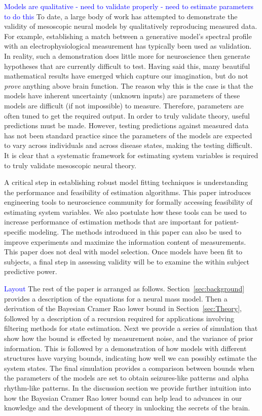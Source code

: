 \documentclass{article}
\newcommand{\brian}[1]{\textcolor{blue}{#1}}
\begin{document}
\brian{Models are qualitative - need to validate properly - need to estimate parameters to do this}
To date, a large body of work has attempted to demonstrate the validity of mesoscopic neural models by qualitatively reproducing measured data. For example, establishing a match between a generative model's spectral profile with an electrophysiological measurement has typically been used as validation. In reality, such a demonstration does little more for neuroscience then generate hypotheses that are currently difficult to test. Having said this, many beautiful mathematical results have emerged which capture our imagination, but do not \emph{prove} anything above brain function. The reason why this is the case is that the models have inherent uncertainty (unknown inputs) are parameters of these models are difficult (if not impossible) to measure. Therefore, parameters are often tuned to get the required output. In order to truly validate theory, useful predictions must be made. However, testing predictions against measured data has not been standard practice since the parameters of the models are expected to vary across individuals and across disease states, making the testing difficult. It is clear that a systematic framework for estimating system variables is required to truly validate mesoscopic neural theory.

A critical step in establishing robust model fitting techniques is understanding the performance and feasibility of estimation algorithms. This paper introduces engineering tools to neuroscience community for formally accessing feasibility of estimating system variables. We also postulate how these tools can be used to increase performance of estimation methods that are important for patient-specific modeling. The methods introduced in this paper can also be used to improve experiments and maximize the information content of measurements. This paper does not deal with model selection. Once models have been fit to subjects, a final step in assessing validity will be to examine the within subject predictive power.  

\brian{Layout}
The rest of the paper is arranged as follows. Section~\ref{sec:background} provides a description of the equations for a neural mass model. Then a derivation of the Bayesian Cramer Rao lower bound in Section~\ref{sec:Theory}, followed by a description of a recursion required for applications involving filtering methods for state estimation. Next we provide a series of simulation that show how the bound is effected by measurement noise, and the variance of prior information. This is followed by a demonstration of how models with different structures have varying bounds, indicating how well we can possibly estimate the system states. The final simulation provides a comparison between bounds when the parameters of the models are set to obtain seizures-like patterns and alpha rhythm-like patterns. In the discussion section we provide further intuition into how the Bayesian Cramer Rao lower bound can help lead to advances in our knowledge and the development of theory in unlocking the secrets of the brain.
\end{document}
